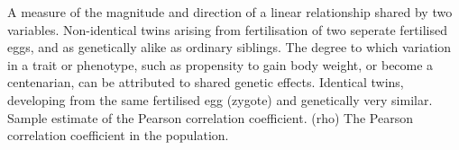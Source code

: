% 
% 
%

 A measure of the magnitude and direction of a linear relationship shared by two variables.
 Non-identical twins arising from fertilisation of two seperate fertilised eggs, and as genetically alike as ordinary siblings.
 The degree to which variation in a trait or phenotype, such as propensity to gain body weight, or become a centenarian, can be attributed to shared genetic effects.
 Identical twins, developing from the same fertilised egg (zygote) and genetically very similar.
 Sample estimate of the Pearson correlation coefficient.
\runinhead{$\rho$} (rho) The Pearson correlation coefficient in the population.
